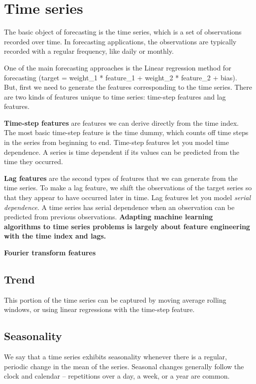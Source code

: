 \documentclass[12pt]{report}
\begin{document}
\section{Time series}
The basic object of forecasting is the time series, which is a set of observations recorded over time. In forecasting applications, the observations are typically recorded with a regular frequency, like daily or monthly.

One of the main forecasting approaches is the Linear regression method for forecasting (target = weight\_1 * feature\_1 + weight\_2 * feature\_2 + bias). But, first we need to generate the features corresponding to the time series. There are two kinds of features unique to time series: time-step features and lag features.

\textbf{Time-step features} are features we can derive directly from the time index. The most basic time-step feature is the time dummy, which counts off time steps in the series from beginning to end. Time-step features let you model time dependence. A series is time dependent if its values can be predicted from the time they occurred.

\textbf{Lag features} are the second types of features that we can generate from the time series. To make a lag feature, we shift the observations of the target series so that they appear to have occurred later in time. Lag features let you model \textit{serial dependence}. A time series has serial dependence when an observation can be predicted from previous observations. \textbf{Adapting machine learning algorithms to time series problems is largely about feature engineering with the time index and lags.}

\textbf{Fourier transform features}


\subsection{Trend}
This portion of the time series can be captured by moving average rolling windows, or using linear regressions with the time-step feature.










\subsection{Seasonality}
We say that a time series exhibits seasonality whenever there is a regular, periodic change in the mean of the series. Seasonal changes generally follow the clock and calendar -- repetitions over a day, a week, or a year are common.
\end{document}
